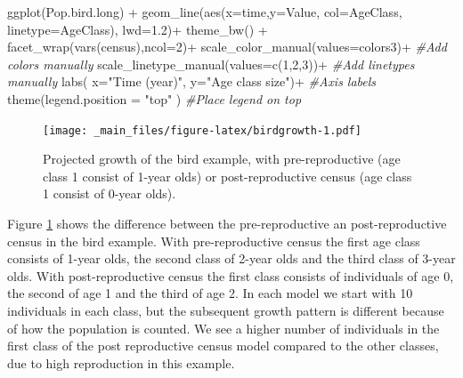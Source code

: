 \documentclass[
]{book}
\newenvironment{Shaded}{\begin{snugshade}}{\end{snugshade}}
\newcommand{\AttributeTok}[1]{\textcolor[rgb]{0.77,0.63,0.00}{#1}}
\newcommand{\CommentTok}[1]{\textcolor[rgb]{0.56,0.35,0.01}{\textit{#1}}}
\newcommand{\DecValTok}[1]{\textcolor[rgb]{0.00,0.00,0.81}{#1}}
\newcommand{\FloatTok}[1]{\textcolor[rgb]{0.00,0.00,0.81}{#1}}
\newcommand{\FunctionTok}[1]{\textcolor[rgb]{0.00,0.00,0.00}{#1}}
\newcommand{\NormalTok}[1]{#1}
\newcommand{\SpecialCharTok}[1]{\textcolor[rgb]{0.00,0.00,0.00}{#1}}
\newcommand{\StringTok}[1]{\textcolor[rgb]{0.31,0.60,0.02}{#1}}
\begin{document}
\begin{Shaded}
\begin{Highlighting}[]
\FunctionTok{ggplot}\NormalTok{(Pop.bird.long) }\SpecialCharTok{+} 
  \FunctionTok{geom\_line}\NormalTok{(}\FunctionTok{aes}\NormalTok{(}\AttributeTok{x=}\NormalTok{time,}\AttributeTok{y=}\NormalTok{Value, }\AttributeTok{col=}\NormalTok{AgeClass,}
                \AttributeTok{linetype=}\NormalTok{AgeClass), }\AttributeTok{lwd=}\FloatTok{1.2}\NormalTok{)}\SpecialCharTok{+}
  \FunctionTok{theme\_bw}\NormalTok{() }\SpecialCharTok{+}
  \FunctionTok{facet\_wrap}\NormalTok{(}\FunctionTok{vars}\NormalTok{(census),}\AttributeTok{ncol=}\DecValTok{2}\NormalTok{)}\SpecialCharTok{+}
  \FunctionTok{scale\_color\_manual}\NormalTok{(}\AttributeTok{values=}\NormalTok{colors3)}\SpecialCharTok{+} \CommentTok{\#Add colors manually}
  \FunctionTok{scale\_linetype\_manual}\NormalTok{(}\AttributeTok{values=}\FunctionTok{c}\NormalTok{(}\DecValTok{1}\NormalTok{,}\DecValTok{2}\NormalTok{,}\DecValTok{3}\NormalTok{))}\SpecialCharTok{+} \CommentTok{\#Add linetypes manually}
  \FunctionTok{labs}\NormalTok{( }\AttributeTok{x=}\StringTok{"Time (year)"}\NormalTok{, }\AttributeTok{y=}\StringTok{"Age class size"}\NormalTok{)}\SpecialCharTok{+} \CommentTok{\#Axis labels}
  \FunctionTok{theme}\NormalTok{(}\AttributeTok{legend.position =} \StringTok{"top"}\NormalTok{ ) }\CommentTok{\#Place legend on top}
\end{Highlighting}
\end{Shaded}

\begin{figure}
\centering
\texttt{[image: \_main\_files/figure-latex/birdgrowth-1.pdf]}
\caption{\label{fig:birdgrowth}Projected growth of the bird example, with pre-reproductive (age class 1 consist of 1-year olds) or post-reproductive census (age class 1 consist of 0-year olds).}
\end{figure}

Figure \ref{fig:birdgrowth} shows the difference between the pre-reproductive an post-reproductive census in the bird example. With pre-reproductive census the first age class consists of 1-year olds, the second class of 2-year olds and the third class of 3-year olds. With post-reproductive census the first class consists of individuals of age 0, the second of age 1 and the third of age 2. In each model we start with 10 individuals in each class, but the subsequent growth pattern is different because of how the population is counted. We see a higher number of individuals in the first class of the post reproductive census model compared to the other classes, due to high reproduction in this example.
\end{document}
